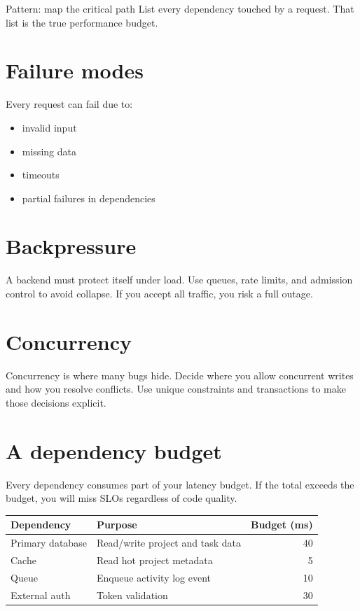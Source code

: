 \begin{patternbox}{Pattern: map the critical path}
List every dependency touched by a request.
That list is the true performance budget.
\end{patternbox}

\section{Failure modes}
Every request can fail due to:
\begin{itemize}[nosep]
  \item invalid input
  \item missing data
  \item timeouts
  \item partial failures in dependencies
\end{itemize}

\section{Backpressure}
A backend must protect itself under load.
Use queues, rate limits, and admission control to avoid collapse.
If you accept all traffic, you risk a full outage.

\section{Concurrency}
Concurrency is where many bugs hide.
Decide where you allow concurrent writes and how you resolve conflicts.
Use unique constraints and transactions to make those decisions explicit.

\section{A dependency budget}
Every dependency consumes part of your latency budget.
If the total exceeds the budget, you will miss SLOs regardless of code quality.

\begin{tabularx}{\textwidth}{@{}lXr@{}}
\toprule
Dependency & Purpose & Budget (ms) \\
\midrule
Primary database & Read/write project and task data & 40 \\
Cache & Read hot project metadata & 5 \\
Queue & Enqueue activity log event & 10 \\
External auth & Token validation & 30 \\
\bottomrule
\end{tabularx}

